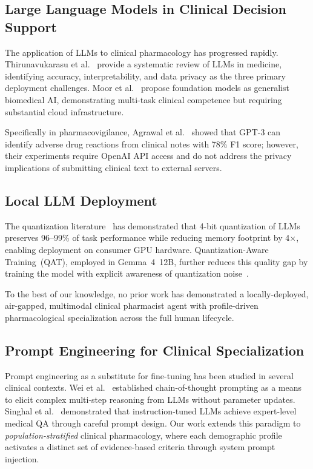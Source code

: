 \documentclass[9pt,conference]{IEEEtran}
\begin{document}
\subsection{Large Language Models in Clinical Decision Support}

The application of LLMs to clinical pharmacology has progressed rapidly.
Thirunavukarasu et al.~\cite{thirunavukarasu2023large} provide a systematic
review of LLMs in medicine, identifying accuracy, interpretability, and
data privacy as the three primary deployment challenges. Moor et al.~\cite{moor2023foundation}
propose foundation models as generalist biomedical AI, demonstrating
multi-task clinical competence but requiring substantial cloud infrastructure.

Specifically in pharmacovigilance, Agrawal et al.~\cite{agrawal2022largelanguagemodelsfewshot} showed
that GPT-3 can identify adverse drug reactions from clinical notes with 78\%
F1 score; however, their experiments require OpenAI API access and do not
address the privacy implications of submitting clinical text to external servers.

\subsection{Local LLM Deployment}

The quantization literature~\cite{dettmers2022llmint88bitmatrixmultiplication,frantar2023gptqaccurateposttrainingquantization} has
demonstrated that 4-bit quantization of LLMs preserves 96--99\% of task
performance while reducing memory footprint by 4$\times$, enabling deployment
on consumer GPU hardware. Quantization-Aware Training~(QAT), employed in
Gemma~4~12B, further reduces this quality gap by training the model with
explicit awareness of quantization noise~\cite{gemma4}.

To the best of our knowledge, no prior work has demonstrated a locally-deployed,
air-gapped, multimodal clinical pharmacist agent with profile-driven
pharmacological specialization across the full human lifecycle.

\subsection{Prompt Engineering for Clinical Specialization}

Prompt engineering as a substitute for fine-tuning has been studied in several
clinical contexts. Wei et al.~\cite{wei2023chainofthoughtpromptingelicitsreasoning} established chain-of-thought
prompting as a means to elicit complex multi-step reasoning from LLMs without
parameter updates. Singhal et al.~\cite{singhal2022largelanguagemodelsencode} demonstrated that
instruction-tuned LLMs achieve expert-level medical QA through careful prompt
design. Our work extends this paradigm to \textit{population-stratified}
clinical pharmacology, where each demographic profile activates a distinct
set of evidence-based criteria through system prompt injection.
\end{document}
